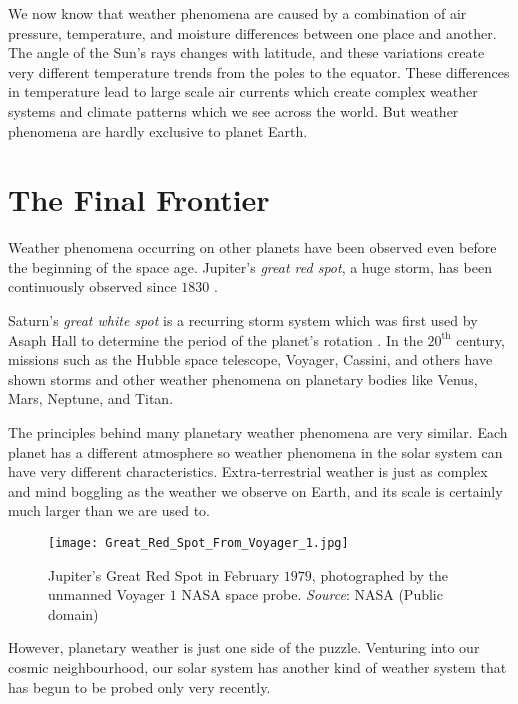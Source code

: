 We now know that weather phenomena are caused by a combination of air pressure, temperature, and 
moisture differences between one place and another. The angle of the Sun's rays changes with 
latitude, and these variations create very different temperature trends from the poles to the 
equator. These differences in temperature lead to large scale air currents which create complex 
weather systems and climate patterns which we see across the world. But weather phenomena are 
hardly exclusive to planet Earth.

\section*{The Final Frontier}



Weather phenomena occurring on other planets have been observed even before the beginning of the 
space age. Jupiter's \emph{great red spot}, a huge storm, has been continuously observed since 
$1830$ \citetext{see \citealp{britannicaRedSpot}}.

Saturn's \emph{great white spot} is a recurring storm system which was first used by Asaph Hall to 
determine the period of the planet's rotation \citep{wikisaturn}. In the $20^{\text{th}}$ century, 
missions such as the Hubble space telescope, Voyager, Cassini, and others have shown storms and 
other weather phenomena on planetary bodies like Venus, Mars, Neptune, and Titan. 

The principles behind many planetary weather phenomena are very similar. Each planet has a 
different atmosphere so weather phenomena in the solar system can have very different 
characteristics. Extra-terrestrial weather is just as complex and mind boggling as the weather we 
observe on Earth, and its scale is certainly much larger than we are used to.

\begin{figure}
    \centering\texttt{[image: Great\_Red\_Spot\_From\_Voyager\_1.jpg]}
    \caption{
        {\small 
            Jupiter's Great Red Spot in February $1979$, photographed by the unmanned 
            Voyager $1$ NASA space probe. \textit{Source}: NASA (Public domain)
        }
    }
    \label{fig:jupiter}
\end{figure}

However, planetary weather is just one side of the puzzle. Venturing into our cosmic neighbourhood, 
our solar system has another kind of weather system that has begun to be probed only very recently. 

